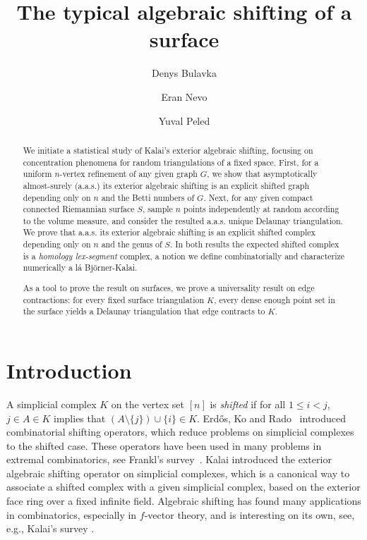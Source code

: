 \documentclass[reqno,english]{amsart}
\title{The typical algebraic shifting of a surface}
\author{Denys Bulavka}
\author{Eran Nevo}
\author{Yuval Peled}
\numberwithin{claimcounter}{theorem}
\theoremstyle{remark}
\theoremstyle{definition}
\numberwithin{theorem}{section}
\begin{document}
\begin{abstract}
We initiate a statistical study of Kalai's exterior algebraic shifting, focusing on concentration phenomena for random triangulations of a fixed space. First, for a uniform $n$-vertex refinement of any given graph $G$, we show that asymptotically almost-surely (a.a.s.) its exterior algebraic shifting is an explicit shifted graph depending only on $n$ and the Betti numbers of $G$. 
Next, for any given compact connected Riemannian surface $S$, sample $n$ points independently at random according to the volume measure, and consider the resulted a.a.s. unique Delaunay triangulation. We prove that a.a.s. its exterior algebraic shifting is an explicit shifted complex depending only on $n$ and the genus of $S$. In both results the expected shifted complex is a \emph{homology lex-segment} complex, a notion we define combinatorially and characterize numerically a l\'{a} Bj\"{o}rner-Kalai. 

As a tool to prove the result on surfaces, we prove a universality result on edge contractions: for every fixed surface triangulation $K$, every dense enough point set in the surface yields a Delaunay triangulation that edge contracts to $K$.
\end{abstract}

\maketitle

\section{Introduction}
A simplicial complex $K$ on the vertex set $[n]$ is \emph{shifted} if for all $1\le i <j$,   $j\in A\in K$ implies that 
$(A\setminus \{j\})\cup \{i\} \in K$.
Erd\H{o}s, Ko and Rado~\cite{erdos61-intersection} introduced
combinatorial shifting operators, which reduce problems on simplicial complexes to the shifted case. These operators have been used 
in many problems in extremal combinatorics, see Frankl's survey~\cite{frankl87-shifting}. 
Kalai \cite{KalaiPart1} introduced the exterior algebraic shifting operator on simplicial complexes, which is a canonical way to associate a shifted complex with a given simplicial complex, based on the exterior face ring over a fixed infinite field. 
Algebraic shifting has found many applications in combinatorics, especially in $f$-vector theory, and is interesting on its own, see, e.g., Kalai's survey 
\cite{kalai02-shifting}.  
\end{document}
